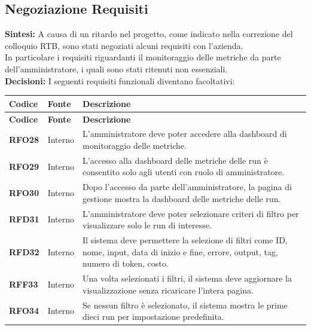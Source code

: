 \documentclass{article}
\begin{document}
    \subsection{Negoziazione Requisiti}
    \textbf{Sintesi:} A causa di un ritardo nel progetto, come indicato nella correzione 
    del colloquio RTB, sono stati negoziati alcuni requisiti con l'azienda. \\
    In particolare i requisiti riguardanti il monitoraggio delle metriche da parte 
    dell'amministratore, i quali sono stati ritenuti non essenziali. \\
    \textbf{Decisioni:} I seguenti requisiti funzionali diventano facoltativi:

    \begin{longtable}{|>{\centering\arraybackslash}m{}|>{\centering\arraybackslash}m{}|>{\arraybackslash}m{}|}
    	\hline
    	\textbf{Codice} & \textbf{Fonte} & \textbf{Descrizione}\\\hline
    	\endfirsthead
    	\hline
    	\textbf{Codice} & \textbf{Fonte} & \textbf{Descrizione}\\\hline
    	\endhead
    	\hline
    	\textbf{RFO28} & Interno 			& L'amministratore deve poter accedere alla dashboard di monitoraggio delle metriche. \\
    	\hline
    	\textbf{RFO29} & Interno 			& L’accesso alla dashboard delle metriche delle run è consentito solo agli utenti con ruolo di amministratore. \\
    	\hline
    	\textbf{RFO30} & Interno 			& Dopo l’accesso da parte dell'amministratore, la pagina di gestione mostra la dashboard delle metriche delle run. \\
    	\hline
    	\textbf{RFD31} & Interno 			& L’amministratore deve poter selezionare criteri di filtro per visualizzare solo le run di interesse. \\
    	\hline
    	\textbf{RFD32} & Interno 			& Il sistema deve permettere la selezione di filtri come ID, nome, input, data di inizio e fine, errore, output, tag, numero di token, costo. \\
    	\hline
    	\textbf{RFF33} & Interno 			& Una volta selezionati i filtri, il sistema deve aggiornare la visualizzazione senza ricaricare l'intera pagina. \\
    	\hline
    	\textbf{RFO34} & Interno 			& Se nessun filtro è selezionato, il sistema mostra le prime dieci run per impostazione predefinita. \\

\end{longtable}
\end{document}
